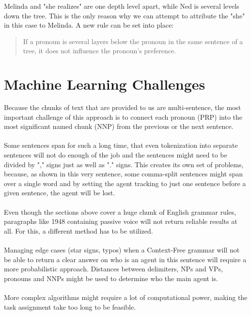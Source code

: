 \documentclass{article}
\begin{document}
\noindent Melinda and "she realizes" are one depth level apart, while Ned is several levels down the tree. This is the only reason why we can attempt to attribute the "she" in this case to Melinda. A new rule can be set into place:
\begin{quote}
    If a pronoun is several layers below the pronoun in the same sentence of a tree, it does not influence the pronoun's preference.
\end{quote}

\section{Machine Learning Challenges}
Because the chunks of text that are provided to us are multi-sentence, the most important challenge of this approach is to connect each pronoun (PRP) into the most significant named chunk (NNP) from the previous or the next sentence. \\ \\
Some sentences span for such a long time, that even tokenization into separate sentences will not do enough of the job and the sentences might need to be divided by "," signs just as well as "." signs. This creates its own set of problems, because, as shown in this very sentence, some comma-split sentences might span over a single word and by setting the agent tracking to just one sentence before a given sentence, the agent will be lost. \\ \\
Even though the sections above cover a huge chunk of English grammar rules, paragraphs like 1948 containing passive voice will not return reliable results at all. For this, a different method has to be utilized. \\ \\
Managing edge cases (star signs, typos) when a Context-Free grammar will not be able to return a clear answer on who is an agent in this sentence will require a more probabilistic approach. Distances between delimiters, NPs and VPs, pronouns and NNPs might be used to determine who the main agent is. \\ \\
More complex algorithms might require a lot of computational power, making the task assignment take too long to be feasible. 
\end{document}
